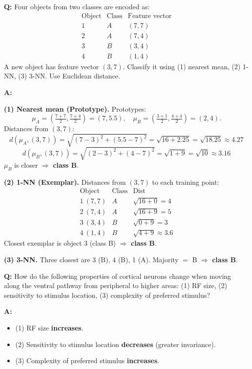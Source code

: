 \begin{exbox}
\textbf{Q:} Four objects from two classes are encoded as:
\[
\begin{array}{cccc}
\text{Object} & \text{Class} & \text{Feature vector} \\
1 & A & (7,7) \\
2 & A & (7,4) \\
3 & B & (3,4) \\
4 & B & (1,4)
\end{array}
\]
A new object has feature vector $(3,7)$. Classify it using (1) nearest mean, (2) 1-NN, (3) 3-NN. Use Euclidean distance.

\textbf{A:}

\textbf{(1) Nearest mean (Prototype).}
Prototypes:
\[
\mu_A = \left(\tfrac{7+7}{2},\tfrac{7+4}{2}\right) = (7, 5.5), \quad
\mu_B = \left(\tfrac{3+1}{2},\tfrac{4+4}{2}\right) = (2, 4).
\]
Distances from $(3,7)$:
\[
d(\mu_A, (3,7)) = \sqrt{(7-3)^2 + (5.5-7)^2} = \sqrt{16 + 2.25} = \sqrt{18.25} \approx 4.27
\]
\[
d(\mu_B, (3,7)) = \sqrt{(2-3)^2 + (4-7)^2} = \sqrt{1 + 9} = \sqrt{10} \approx 3.16
\]
$\mu_B$ is closer $\Rightarrow$ \textbf{class B}.

\textbf{(2) 1-NN (Exemplar).} Distances from $(3,7)$ to each training point:
\[
\begin{array}{ccc}
\text{Object} & \text{Class} & \text{Dist} \\
1\ (7,7) & A & \sqrt{16+0} = 4 \\
2\ (7,4) & A & \sqrt{16+9} = 5 \\
3\ (3,4) & B & \sqrt{0+9} = 3 \\
4\ (1,4) & B & \sqrt{4+9} \approx 3.6
\end{array}
\]
Closest exemplar is object 3 (class B) $\Rightarrow$ \textbf{class B}.

\textbf{(3) 3-NN.} Three closest are 3 (B), 4 (B), 1 (A). Majority $=$ B $\Rightarrow$ \textbf{class B}.
\end{exbox}

\begin{exbox}
\textbf{Q:} How do the following properties of cortical neurons change when moving along the ventral pathway from peripheral to higher areas: (1) RF size, (2) sensitivity to stimulus location, (3) complexity of preferred stimulus?

\textbf{A:}
\begin{itemize}
  \item (1) RF size \textbf{increases}.
  \item (2) Sensitivity to stimulus location \textbf{decreases} (greater invariance).
  \item (3) Complexity of preferred stimulus \textbf{increases}.
\end{itemize}
\end{exbox}

